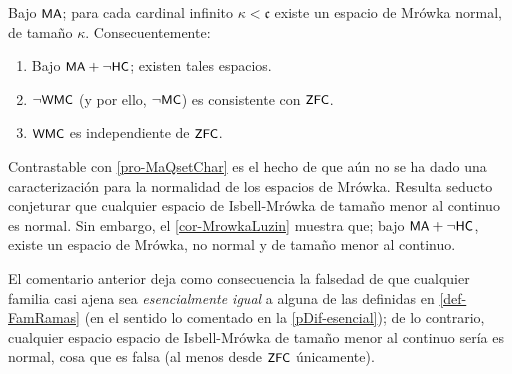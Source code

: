         \begin{corolario}\label{cor-PdmIndependiente}
            Bajo $\text{\textsf{\small MA}}$; para cada cardinal infinito $\kappa<\mathfrak{c}$ existe un espacio de Mrówka normal, de tamaño $\kappa$. Consecuentemente:
            \begin{enumerate}
                \item Bajo $\text{\textsf{\small MA}}+\lnot \text{\textsf{\small HC}}$; existen tales espacios.
                \item $\lnot\text{\textsf{\small WMC}}$ (y por ello, $\lnot\text{\textsf{\small MC}}$) es consistente con $\text{\textsf{\small ZFC}}$.
                \item $\text{\textsf{\small WMC}}$ es independiente de $\text{\textsf{\small ZFC}}$.
            \end{enumerate}
        \end{corolario}

        Contrastable con \ref{pro-MaQsetChar} es el hecho de que aún no se ha dado una caracterización para la normalidad de los espacios de Mrówka. Resulta seducto conjeturar que cualquier espacio de Isbell-Mrówka de tamaño menor al continuo es normal. Sin embargo, el \autoref{cor-MrowkaLuzin} muestra que; bajo $\text{\textsf{\small MA}}+\lnot \text{\textsf{\small HC}}$, existe un espacio de Mrówka, no normal y de tamaño menor al continuo.
        
        El comentario anterior deja como consecuencia la falsedad de que cualquier familia casi ajena sea \textit{esencialmente igual} a alguna de las definidas en \ref{def-FamRamas} (en el sentido lo comentado en la \autoref{pDif-esencial}); de lo contrario, cualquier espacio espacio de Isbell-Mrówka de tamaño menor al continuo sería es normal, cosa que es falsa (al menos desde $\text{\textsf{\small ZFC}}$ únicamente).


        


        
    





